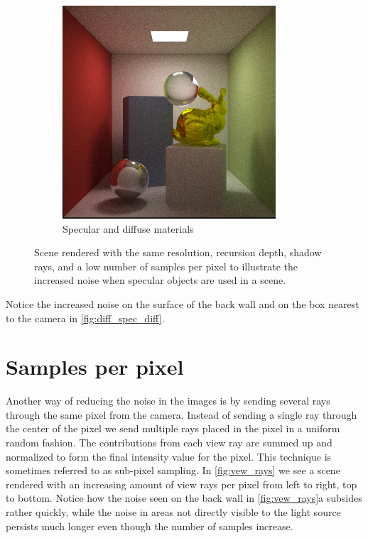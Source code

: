 \documentclass[a4paper, 12pt]{report}
\begin{document}
\begin{figure}
        \begin{subfigure}[b]{0.65\textwidth}
                \includegraphics[width=\textwidth]{figures/specular_100rpp-.png}
                \caption{Specular and diffuse materials}
                \label{fig:dif_spec2}
        \end{subfigure}
        \caption{Scene rendered with the same resolution, recursion depth, shadow rays, and a low number of samples per pixel to illustrate the increased noise when specular objects are used in a scene.}\label{fig:diff_spec_diff}
\end{figure}

Notice the increased noise on the surface of the back wall and on the box nearest to the camera in \autoref{fig:diff_spec_diff}.

\section{Samples per pixel}
Another way of reducing the noise in the images is by sending several rays through the same pixel from the camera. 
Instead of sending a single ray through the center of the pixel we send multiple rays placed in the pixel in a uniform random fashion. 
The contributions from each view ray are summed up and normalized to form the final intensity value for the pixel. 
This technique is sometimes referred to as sub-pixel sampling. 
In \autoref{fig:vew_rays} we see a scene rendered with an increasing amount of view rays per pixel from left to right, top to bottom. 
Notice how the noise seen on the back wall in \autoref{fig:vew_rays}a subsides rather quickly, while the noise in areas not directly visible to the light source persists much longer even though the number of samples increase.
\end{document}
